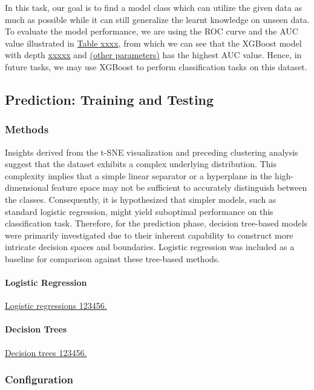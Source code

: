 \documentclass{article}
\begin{document}


In this task, our goal is to find a model class which can utilize the given data as much as possible while it can still generalize the learnt knowledge on unseen data. To evaluate the model performance, we are using the ROC curve and the AUC value illustrated in \underline{Table xxxx}, from which we can see that the XGBoost model with depth \underline{xxxxx} and \underline{(other parameters)} has the highest AUC value. Hence, in future tasks, we may use XGBoost to perform classification tasks on this dataset. 

\subsection{Prediction: Training and Testing}

\subsubsection*{Methods}

Insights derived from the t-SNE visualization and preceding clustering analysis suggest that the dataset exhibits a complex underlying distribution. This complexity implies that a simple linear separator or a hyperplane in the high-dimensional feature space may not be sufficient to accurately distinguish between the classes. Consequently, it is hypothesized that simpler models, such as standard logistic regression, might yield suboptimal performance on this classification task. Therefore, for the prediction phase, decision tree-based models were primarily investigated due to their inherent capability to construct more intricate decision spaces and boundaries. Logistic regression was included as a baseline for comparison against these tree-based methods.

\paragraph{Logistic Regression} \underline{Logistic regressions 123456.}

\paragraph{Decision Trees} \underline{Decision trees 123456.}

\subsubsection*{Configuration}
\end{document}
